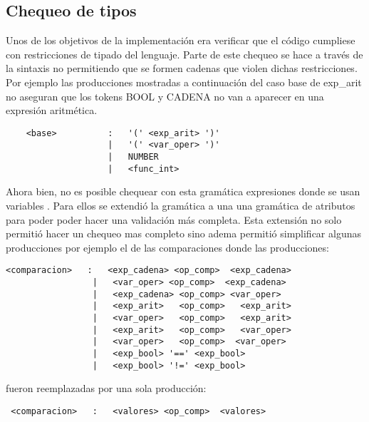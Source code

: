 \subsection{Chequeo de tipos}

Unos de los objetivos de la implementación era verificar que el código cumpliese con restricciones de tipado del lenguaje. Parte de este chequeo se hace a través de la sintaxis no permitiendo  que se formen cadenas que violen dichas restricciones. 
Por ejemplo las producciones mostradas a continuación del caso  base de exp\_arit no aseguran que los tokens BOOL y CADENA no van a aparecer en una expresión aritmética. 
\begin{verbatim}
    <base>          :   '(' <exp_arit> ')'
                    |   '(' <var_oper> ')'
                    |   NUMBER
                    |   <func_int>

\end{verbatim}
	Ahora bien, no es posible chequear con esta gramática expresiones donde se usan variables . Para ellos se extendió la gramática a una una gramática de atributos para poder poder hacer una validación más completa. Esta extensión no solo permitió hacer un chequeo mas completo sino adema permitió simplificar algunas producciones por ejemplo el de las comparaciones donde las producciones:
    
\begin{verbatim}
<comparacion>   :   <exp_cadena> <op_comp>  <exp_cadena>
                 |   <var_oper> <op_comp>  <exp_cadena>
                 |   <exp_cadena> <op_comp> <var_oper> 
                 |   <exp_arit>   <op_comp>   <exp_arit>
                 |   <var_oper>   <op_comp>   <exp_arit>
                 |   <exp_arit>   <op_comp>   <var_oper>
                 |   <var_oper>   <op_comp>  <var_oper>
                 |   <exp_bool> '==' <exp_bool>
                 |   <exp_bool> '!=' <exp_bool>
\end{verbatim}
fueron reemplazadas por una sola producción:
\begin{verbatim}
 <comparacion>   :   <valores> <op_comp>  <valores>
\end{verbatim}
 



